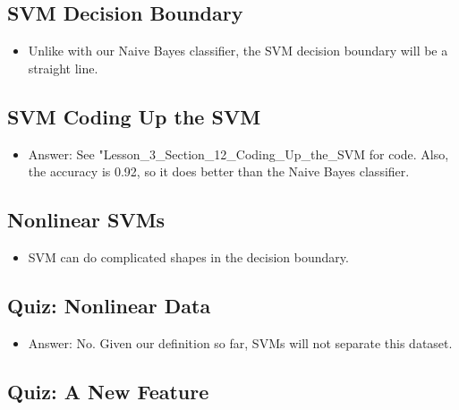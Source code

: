 \documentclass[12pt]{report}
\begin{document}
\subsection{SVM Decision Boundary}

\begin{itemize}

\item Unlike with our Naive Bayes classifier, the SVM decision boundary will be a straight line. 

\end{itemize}

\subsection{SVM Coding Up the SVM}

\begin{itemize}

\item Answer: See "Lesson\_3\_Section\_12\_Coding\_Up\_the\_SVM for code. Also, the accuracy is 0.92, so it does better than the Naive Bayes classifier. 

\end{itemize}


\subsection{Nonlinear SVMs}

\begin{itemize}

\item SVM can do complicated shapes in the decision boundary. 

\end{itemize}


\subsection{Quiz: Nonlinear Data}

\begin{itemize}

\item Answer: No. Given our definition so far, SVMs will not separate this dataset.

\end{itemize}

\subsection{Quiz: A New Feature}
\end{document}
